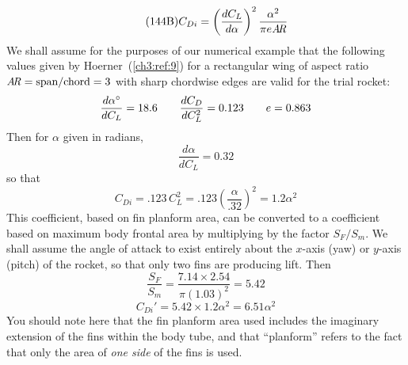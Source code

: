 \begin{equation*}\tag{144B}\label{ch3:eq:n144B}
C_{Di} = \left(\frac{dC_L}{d\alpha}\right)^{2}\frac{\alpha^{2}}{\pi e\mathit{A\mkern-3mu R}}
\end{equation*}
We shall assume for the purposes of our numerical example that the following
values given by Hoerner~(\ref{ch3:ref:9}) for a rectangular wing of aspect ratio
$\mathit{A\mkern-3mu R} = \text{span/chord} = 3$ with sharp chordwise edges are valid for the trial
rocket:
\begin{equation*}
\frac{d\alpha^{\circ}}{dC_L} = 18.6 \qquad \frac{dC_{D}}{dC_L^2} = 0.123 \qquad e = 0.863
\end{equation*}
Then for $\alpha$ given in radians,
\begin{equation*}
\frac{d\alpha}{dC_L} = 0.32
\end{equation*}
so that
\begin{equation*}
C_{Di} = .123\,C_L^2 = .123\left(\frac{\alpha}{.32}\right)^2 = 1.2\alpha^2
\end{equation*}
This coefficient, based on fin planform area, can be converted to a coefficient
based on maximum body frontal area by multiplying by the factor $S_F/S_m$. We
shall assume the angle of attack to exist entirely about the $x$-axis (yaw) or
$y$-axis (pitch) of the rocket, so that only two fins are producing lift. Then
\begin{equation*}
\frac{S_F}{S_m} = \frac{7.14\times 2.54}{\pi(1.03)^2} = 5.42
\end{equation*}
\begin{equation}\label{ch3:eq:145}
C_{Di}' = 5.42\times 1.2\alpha^2 = 6.51\alpha^2
\end{equation}
You should note here that the fin planform area used includes the imaginary
extension of the fins within the body tube, and that ``planform'' refers to the
fact that only the area of \emph{one side} of the fins is used.

